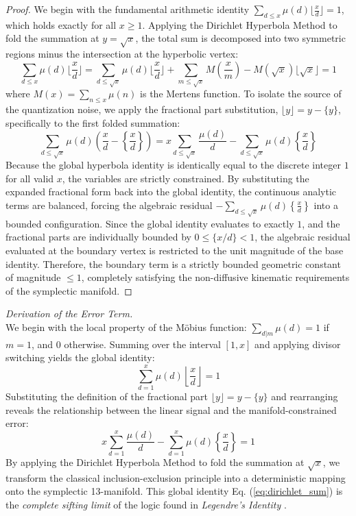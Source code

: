 \documentclass[sn-mathphys-num, pdflatex]{sn-jnl}
\begin{document}
\begin{proof}
We begin with the fundamental arithmetic identity $\sum_{d \le x} \mu(d) \lfloor \frac{x}{d} \rfloor = 1$, which holds exactly for all $x \ge 1$. Applying the Dirichlet Hyperbola Method to fold the summation at $y = \sqrt{x}$, the total sum is decomposed into two symmetric regions minus the intersection at the hyperbolic vertex:
$$\sum_{d \le x} \mu(d) \lfloor \frac{x}{d} \rfloor = \sum_{d \le \sqrt{x}} \mu(d) \lfloor \frac{x}{d} \rfloor + \sum_{m \le \sqrt{x}} M\left(\frac{x}{m}\right) - M(\sqrt{x})\lfloor \sqrt{x} \rfloor = 1$$
where $M(x) = \sum_{n \le x} \mu(n)$ is the Mertens function. To isolate the source of the quantization noise, we apply the fractional part substitution, $\lfloor y \rfloor = y - \{y\}$, specifically to the first folded summation:
$$\sum_{d \le \sqrt{x}} \mu(d) \left( \frac{x}{d} - \left\{ \frac{x}{d} \right\} \right) = x \sum_{d \le \sqrt{x}} \frac{\mu(d)}{d} - \sum_{d \le \sqrt{x}} \mu(d) \left\{ \frac{x}{d} \right\}$$
Because the global hyperbola identity is identically equal to the discrete integer $1$ for all valid $x$, the variables are strictly constrained. By substituting the expanded fractional form back into the global identity, the continuous analytic terms are balanced, forcing the algebraic residual $-\sum_{d \le \sqrt{x}} \mu(d)\left\{\frac{x}{d}\right\}$ into a bounded configuration. Since the global identity evaluates to exactly $1$, and the fractional parts are individually bounded by $0 \le \{x/d\} < 1$, the algebraic residual evaluated at the boundary vertex is restricted to the unit magnitude of the base identity. Therefore, the boundary term is a strictly bounded geometric constant of magnitude $\le 1$, completely satisfying the non-diffusive kinematic requirements of the symplectic manifold.
\end{proof}

\noindent \textit{Derivation of the Error Term.}\\
We begin with the local property of the M\"{o}bius function: $\sum_{d|m} \mu(d) = 1$ if $m=1$, and $0$ otherwise. Summing over the interval $[1, x]$ and applying divisor switching yields the global identity:
\begin{equation}
\sum_{d=1}^{x} \mu(d) \left\lfloor \frac{x}{d} \right\rfloor = 1
\label{eq:dirichlet_sum}
\end{equation}
Substituting the definition of the fractional part $\lfloor y \rfloor = y - \{y\}$ and rearranging reveals the relationship between the linear signal and the manifold-constrained error:
\begin{equation}
x \sum_{d=1}^{x} \frac{\mu(d)}{d} - \sum_{d=1}^{x} \mu(d) \left\{ \frac{x}{d} \right\} = 1
\label{eq:global_fractional}
\end{equation}
By applying the Dirichlet Hyperbola Method to fold the summation at $\sqrt{x}$, we transform the classical inclusion-exclusion principle into a deterministic mapping onto the symplectic 13-manifold. This global identity Eq. (\ref{eq:dirichlet_sum}) is the \textit{complete sifting limit} of the logic found in \textit{Legendre's Identity} \cite{legendre}. 
\end{document}
